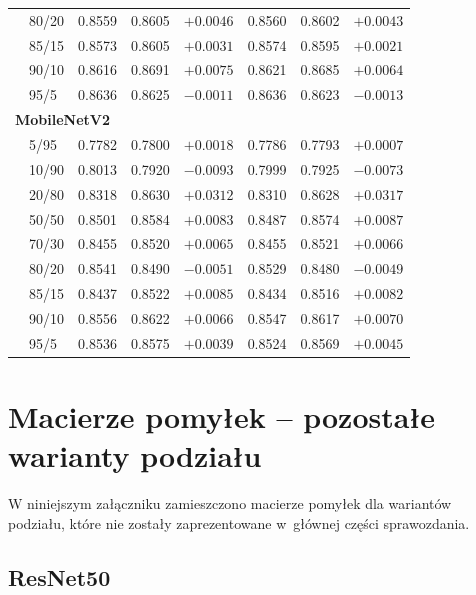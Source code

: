 \documentclass[12pt,a4paper]{article}
\begin{document}
\begin{table}[H]
{\begin{tabular}{llcccccc}
        & 80/20  & 0.8559 & 0.8605 & $+0.0046$ & 0.8560 & 0.8602 & $+0.0043$ \\
        & 85/15  & 0.8573 & 0.8605 & $+0.0031$ & 0.8574 & 0.8595 & $+0.0021$ \\
        & 90/10  & 0.8616 & 0.8691 & $+0.0075$ & 0.8621 & 0.8685 & $+0.0064$ \\
        & 95/5   & 0.8636 & 0.8625 & $-0.0011$ & 0.8636 & 0.8623 & $-0.0013$ \\
        \midrule
        \multicolumn{8}{l}{\textbf{MobileNetV2}} \\
        \midrule
        & 5/95   & 0.7782 & 0.7800 & $+0.0018$ & 0.7786 & 0.7793 & $+0.0007$ \\
        & 10/90  & 0.8013 & 0.7920 & $-0.0093$ & 0.7999 & 0.7925 & $-0.0073$ \\
        & 20/80  & 0.8318 & 0.8630 & $+0.0312$ & 0.8310 & 0.8628 & $+0.0317$ \\
        & 50/50  & 0.8501 & 0.8584 & $+0.0083$ & 0.8487 & 0.8574 & $+0.0087$ \\
        & 70/30  & 0.8455 & 0.8520 & $+0.0065$ & 0.8455 & 0.8521 & $+0.0066$ \\
        & 80/20  & 0.8541 & 0.8490 & $-0.0051$ & 0.8529 & 0.8480 & $-0.0049$ \\
        & 85/15  & 0.8437 & 0.8522 & $+0.0085$ & 0.8434 & 0.8516 & $+0.0082$ \\
        & 90/10  & 0.8556 & 0.8622 & $+0.0066$ & 0.8547 & 0.8617 & $+0.0070$ \\
        & 95/5   & 0.8536 & 0.8575 & $+0.0039$ & 0.8524 & 0.8569 & $+0.0045$ \\
        \bottomrule
    \end{tabular}%
    }
\end{table}


\clearpage
\section{Macierze pomyłek -- pozostałe warianty podziału}
\label{ad:remaining_cm}

W niniejszym załączniku zamieszczono macierze pomyłek dla wariantów podziału, które nie zostały zaprezentowane w~głównej części sprawozdania.

\subsection{ResNet50}
\end{document}
